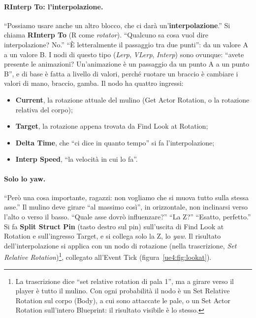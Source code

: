 \paragraph{RInterp To: l'interpolazione.} ``Possiamo usare anche un altro blocco, che ci
darà un'\textbf{interpolazione}.'' Si chiama \textbf{RInterp To} (R come
\emph{rotator}). ``Qualcuno sa cosa vuol dire interpolazione? No.'' ``È letteralmente
il passaggio tra due punti'': da un valore A a un valore B. I nodi di questo tipo
(\emph{Lerp}, \emph{VLerp}, \emph{Interp}) sono ovunque: ``avete presente le animazioni?
Un'animazione è un passaggio da un punto A a un punto B'', e di base è fatta a livello
di valori, perché ruotare un braccio è cambiare i valori di mano, braccio, gamba. Il
nodo ha quattro ingressi:
\begin{itemize}
  \item \textbf{Current}, la rotazione attuale del mulino (Get Actor Rotation, o la
        rotazione relativa del corpo);
  \item \textbf{Target}, la rotazione appena trovata da Find Look at Rotation;
  \item \textbf{Delta Time}, che ``ci dice in quanto tempo'' si fa l'interpolazione;
  \item \textbf{Interp Speed}, ``la velocità in cui lo fa''.
\end{itemize}

\paragraph{Solo lo yaw.} ``Però una cosa importante, ragazzi: non vogliamo che si muova
tutto sulla stessa asse.'' Il mulino deve girare ``al massimo così'', in orizzontale,
non inclinarsi verso l'alto o verso il basso. ``Quale asse dovrò influenzare?''
``La Z?'' ``Esatto, perfetto.'' Si fa \textbf{Split Struct Pin} (tasto destro sul pin)
sull'uscita di Find Look at Rotation e sull'ingresso Target, e si collega solo la Z,
lo \emph{yaw}. Il risultato dell'interpolazione si applica con un nodo di rotazione
(nella trascrizione, \emph{Set Relative Rotation})\footnote{La trascrizione dice ``set
relative rotation di pala 1'', ma a girare verso il player è tutto il mulino. Con ogni
probabilità il nodo è un Set Relative Rotation sul corpo (Body), a cui sono attaccate le
pale, o un Set Actor Rotation sull'intero Blueprint: il risultato visibile è lo
stesso.}, collegato all'Event Tick (figura~\ref{ue4:fig:lookat}).

